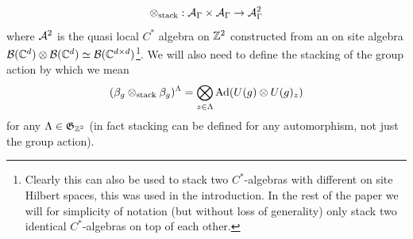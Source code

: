 \documentclass[12pt,a4paper,twoside]{article}
\numberwithin{equation}{section}
\begin{document}
\begin{equation}
	\otimes_{\text{stack}}:\AA_{\Gamma}\times\AA_{\Gamma}\rightarrow \AA^2_{\Gamma}
\end{equation}
where $\AA^2$ is the quasi local $C^*$ algebra on $\ZZ^2$ constructed from an on site algebra $\BB(\CC^d)\otimes\BB(\CC^d)\simeq \BB(\CC^{d\times d})$\footnote{Clearly this can also be used to stack two $C^*$-algebras with different on site Hilbert spaces, this was used in the introduction. In the rest of the paper we will for simplicity of notation (but without loss of generality) only stack two identical $C^*$-algebras on top of each other.}. We will also need to define the stacking of the group action by which we mean
\begin{equation}
	(\beta_g\otimes_{\text{stack}}\beta_g)^\Lambda=\bigotimes_{z\in\Lambda}\Ad{U(g)\otimes U(g)_z}
\end{equation}
for any $\Lambda\in\mathfrak{G}_{\ZZ^2}$ (in fact stacking can be defined for any automorphism, not just the group action).
\end{document}
